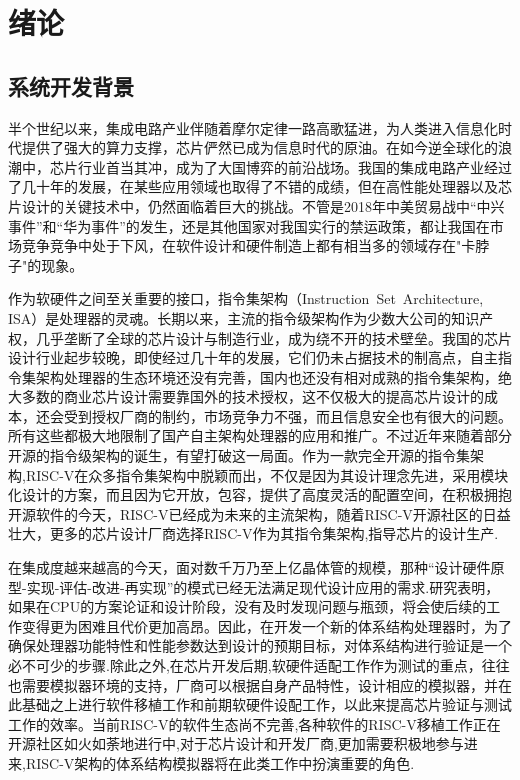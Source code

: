 
\chapter{绪论}

\section{系统开发背景}
半个世纪以来，集成电路产业伴随着摩尔定律一路高歌猛进，为人类进入信息化时代提供了强大的算力支撑，芯片俨然已成为信息时代的原油。在如今逆全球化的浪潮中，芯片行业首当其冲，成为了大国博弈的前沿战场。我国的集成电路产业经过了几十年的发展，在某些应用领域也取得了不错的成绩，但在高性能处理器以及芯片设计的关键技术中，仍然面临着巨大的挑战\cite{huzhenbo,huzhenbo1}。不管是2018年中美贸易战中“中兴事件”和“华为事件”的发生，还是其他国家对我国实行的禁运政策，都让我国在市场竞争竞争中处于下风，在软件设计和硬件制造上都有相当多的领域存在"卡脖子"的现象。


作为软硬件之间至关重要的接口，指令集架构（Instruction Set Architecture, ISA）是处理器的灵魂。长期以来，主流的指令级架构作为少数大公司的知识产权，几乎垄断了全球的芯片设计与制造行业，成为绕不开的技术壁垒。我国的芯片设计行业起步较晚，即使经过几十年的发展，它们仍未占据技术的制高点，自主指令集架构处理器的生态环境还没有完善，国内也还没有相对成熟的指令集架构，绝大多数的商业芯片设计需要靠国外的技术授权，这不仅极大的提高芯片设计的成本，还会受到授权厂商的制约，市场竞争力不强，而且信息安全也有很大的问题。所有这些都极大地限制了国产自主架构处理器的应用和推广。不过近年来随着部分开源的指令级架构的诞生，有望打破这一局面。作为一款完全开源的指令集架构,RISC-V在众多指令集架构中脱颖而出，不仅是因为其设计理念先进，采用模块化设计的方案，而且因为它开放，包容，提供了高度灵活的配置空间，在积极拥抱开源软件的今天，RISC-V已经成为未来的主流架构，随着RISC-V开源社区的日益壮大，更多的芯片设计厂商选择RISC-V作为其指令集架构,指导芯片的设计生产\cite{包云岗2022开源芯片生态技术体系构建面临的机遇与挑战}.


在集成度越来越高的今天，面对数千万乃至上亿晶体管的规模，那种“设计硬件原型-实现-评估-改进-再实现”的模式已经无法满足现代设计应用的需求\cite{jichengdu}.研究表明，如果在CPU的方案论证和设计阶段，没有及时发现问题与瓶颈，将会使后续的工作变得更为困难且代价更加高昂。因此，在开发一个新的体系结构处理器时，为了确保处理器功能特性和性能参数达到设计的预期目标，对体系结构进行验证是一个必不可少的步骤\cite{buzhou}.除此之外,在芯片开发后期,软硬件适配工作作为测试的重点\cite{黄聪会2012软件移植理论与技术研究}，往往也需要模拟器环境的支持\cite{butko2012accuracy}，厂商可以根据自身产品特性，设计相应的模拟器，并在此基础之上进行软件移植工作和前期软硬件设配工作，以此来提高芯片验证与测试工作的效率。当前RISC-V的软件生态尚不完善,各种软件的RISC-V移植工作正在开源社区如火如荼地进行中,对于芯片设计和开发厂商,更加需要积极地参与进来,RISC-V架构的体系结构模拟器将在此类工作中扮演重要的角色.



